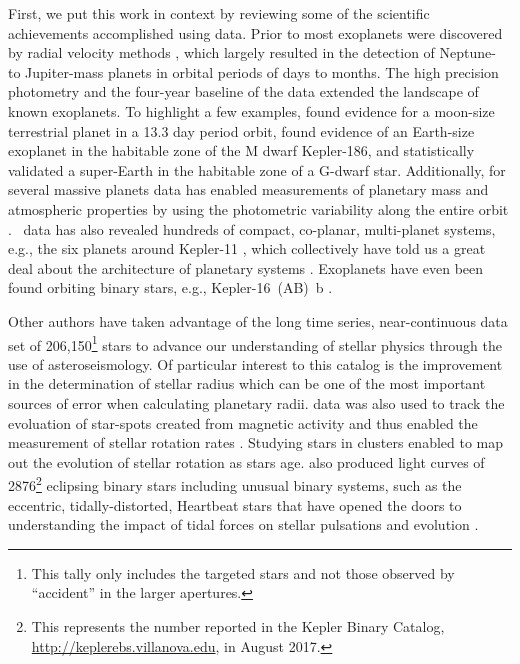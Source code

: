 First, we put this work in context by reviewing some of the scientific achievements accomplished using \Kepler{} data.  Prior to \Kepler{,} most exoplanets were discovered by radial velocity methods \citep[e.g.][]{Mayor1995}, which largely resulted in the detection of Neptune- to Jupiter-mass planets in orbital periods of days to months. The high precision photometry and the four-year baseline of the \Kepler{} data extended the landscape of known exoplanets.  To highlight a few examples, \citet{Barclay2013} found evidence for a moon-size terrestrial planet in a 13.3 day period orbit, \citet{Quintana2014} found evidence of an Earth-size exoplanet in the habitable zone of the M dwarf Kepler-186, and \citet{Jenkins2015} statistically validated a super-Earth in the habitable zone of a G-dwarf star. Additionally, for several massive planets \Kepler{} data has enabled measurements of planetary mass and atmospheric properties by using the photometric variability along the entire orbit \citep{Shporer2011,Mazeh2012,Shporer2017}. \Kepler\ data has also revealed hundreds of compact, co-planar, multi-planet systems, e.g., the six planets around Kepler-11 \citep{Lissauer2011}, which collectively have told us a great deal about the architecture of planetary systems \citep{Lissauer2011b,Fabrycky2014}.   Exoplanets have even been found orbiting binary stars, e.g., Kepler-16~(AB)~b \citep{Doyle2011}.

Other authors have taken advantage of the long time series, near-continuous data set of 206,150\footnote{This tally only includes the targeted stars and not those observed by ``accident'' in the larger apertures.} stars to advance our understanding of stellar physics through the use of asteroseismology. Of particular interest to this catalog is the improvement in the determination of stellar radius \citep[e.g.,][]{Huber2014a,Mathur2017ApJS} which can be one of the most important sources of error when calculating planetary radii. \Kepler{} data was also used to track the evoluation of star-spots created from magnetic activity and thus enabled the measurement of stellar rotation rates \citep[e.g.][]{Aigrain2015,Garcia2014,McQuillan2014,Zimmerman2017}. Studying stars in clusters enabled \citet{Meibom2011} to map out the evolution of stellar rotation as stars age. \Kepler{} also produced light curves of 2876\footnote{This represents the number reported in the Kepler Binary Catalog, \url{http://keplerebs.villanova.edu}, in August 2017.} eclipsing binary stars \citep{Prsa2011,Kirk2016} including unusual binary systems, such as the eccentric, tidally-distorted, Heartbeat stars \citep{Welsh2011,Thompson2012,Shporer2016hb} that have opened the doors to understanding the impact of tidal forces on stellar pulsations and evolution \citep[e.g.,][]{Hambleton2017,Fuller2017}.

